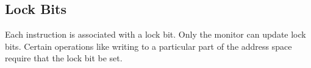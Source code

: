 \documentclass[12pt, letterpaper]{article}
\begin{document}
\subsection{Lock Bits}

Each instruction is associated with a lock bit.
Only the monitor can update lock bits.
Certain operations like writing to a particular part of the address space
require that the lock bit be set. 


\end{document}
